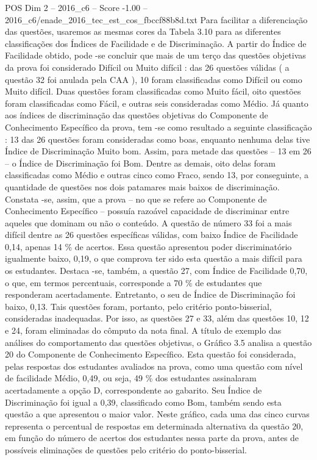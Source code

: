 \begin{textsample}{POS Dim 2 – 2016\_c6 – Score -1.00 – 2016\_c6/enade\_2016\_tec\_est\_cos\_fbccf88b8d.txt}
Para facilitar a diferenciação das questões, usaremos as mesmas cores da Tabela 3.10 para as diferentes classificações dos Índices de Facilidade e de Discriminação.
A partir do Índice de Facilidade obtido, pode -se concluir que mais de um terço das questões objetivas da prova foi considerado Difícil ou Muito difícil : das 26 questões válidas ( a questão 32 foi anulada pela CAA ), 10 foram classificadas como Difícil ou como Muito difícil.
Duas questões foram classificadas como Muito fácil, oito questões foram classificadas como Fácil, e outras seis consideradas como Médio.
Já quanto aos índices de discriminação das questões objetivas do Componente de Conhecimento Específico da prova, tem -se como resultado a seguinte classificação : 13 das 26 questões foram consideradas como boas, enquanto nenhuma delas tive Índice de Discriminação Muito bom.
Assim, para metade das questões – 13 em 26 – o Índice de Discriminação foi Bom.
Dentre as demais, oito delas foram classificadas como Médio e outras cinco como Fraco, sendo 13, por conseguinte, a quantidade de questões nos dois patamares mais baixos de discriminação.
Constata -se, assim, que a prova – no que se refere ao Componente de Conhecimento Específico – possuía razoável capacidade de discriminar entre aqueles que dominam ou não o conteúdo.
A questão de número 33 foi a mais difícil dentre as 26 questões específicas válidas, com baixo Índice de Facilidade 0,14, apenas 14 \% de acertos.
Essa questão apresentou poder discriminatório igualmente baixo, 0,19, o que comprova ter sido esta questão a mais difícil para os estudantes.
Destaca -se, também, a questão 27, com Índice de Facilidade 0,70, o que, em termos percentuais, corresponde a 70 \% de estudantes que responderam acertadamente.
Entretanto, o seu de Índice de Discriminação foi baixo, 0,13.
Tais questões foram, portanto, pelo critério ponto-bisserial, consideradas inadequadas.
Por isso, as questões 27 e 33, além das questões 10, 12 e 24, foram eliminadas do cômputo da nota final.
A título de exemplo das análises do comportamento das questões objetivas, o Gráfico 3.5 analisa a questão 20 do Componente de Conhecimento Específico.
Esta questão foi considerada, pelas respostas dos estudantes avaliados na prova, como uma questão com nível de facilidade Médio, 0,49, ou seja, 49 \% dos estudantes assinalaram acertadamente a opção D, correspondente ao gabarito.
Seu Índice de Discriminação foi igual a 0,39, classificado como Bom, também sendo esta questão a que apresentou o maior valor.
Neste gráfico, cada uma das cinco curvas representa o percentual de respostas em determinada alternativa da questão 20, em função do número de acertos dos estudantes nessa parte da prova, antes de possíveis eliminações de questões pelo critério do ponto-bisserial.

\end{textsample}
